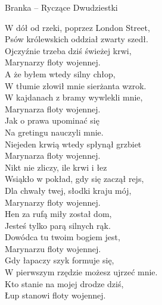 \begin{piosenka}{Branka -- Ryczące Dwudziestki}

W dół od rzeki, poprzez London Street, \\
Psów królewskich oddział zwarty szedł. \\
Ojczyźnie trzeba dziś świeżej krwi, \\
Marynarzy floty wojennej. \\[\zwrotkaspace]

A że byłem wtedy silny chłop, \\
W tłumie złowił mnie sierżanta wzrok. \\ 
W kajdanach z bramy wywlekli mnie, \\
Marynarza floty wojennej. \\[\zwrotkaspace]

Jak o prawa upominać się \\
Na gretingu nauczyli mnie. \\
Niejeden krwią wtedy spłynął grzbiet \\ 
Marynarza floty wojennej. \\[\zwrotkaspace]

Nikt nie zliczy, ile krwi i łez \\
Wsiąkło w pokład, gdy się zaczął rejs, \\ 
Dla chwały twej, słodki kraju mój, \\
Marynarzy floty wojennej. \\[\zwrotkaspace]

Hen za rufą miły został dom, \\
Jesteś tylko parą silnych rąk. \\
Dowódca tu twoim bogiem jest, \\
Marynarzu floty wojennej. \\[\zwrotkaspace]

Gdy łapaczy szyk formuje się, \\
W pierwszym rzędzie możesz ujrzeć mnie. \\ 
Kto stanie na mojej drodze dziś, \\
Łup stanowi floty wojennej. \\[\zwrotkaspace]

\end{piosenka}